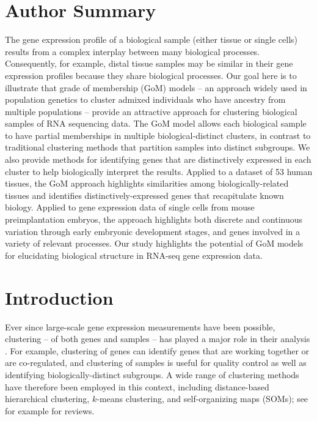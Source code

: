 \documentclass[10pt,letterpaper]{article}
\begin{document}
\section*{Author Summary}
The gene expression profile of a biological sample (either tissue or single cells) results from a complex interplay between many biological processes. Consequently, for example, distal tissue samples may be similar in their gene expression profiles because they share biological processes. Our goal here is to illustrate that grade of membership (GoM) models -- an approach widely used in population genetics to cluster admixed individuals who have ancestry from multiple populations -- provide an attractive approach for clustering biological samples of RNA sequencing data. The GoM model allows each biological sample to have partial memberships in multiple biological-distinct clusters, in contrast to traditional clustering methods that partition samples into distinct subgroups. We also provide methods for identifying genes that are distinctively expressed in each cluster to help biologically interpret the results. Applied to a dataset of 53 human tissues, the GoM approach highlights similarities among biologically-related tissues and identifies distinctively-expressed genes that recapitulate known biology. Applied to gene expression data of single cells from mouse preimplantation embryos, the approach highlights both discrete and continuous variation through early embryonic development stages, and genes involved in a variety of relevant processes. Our study highlights the potential of GoM models for elucidating biological structure in RNA-seq gene expression data.
\linenumbers


\section*{Introduction}

Ever since large-scale gene expression measurements have been possible, clustering -- of both genes and samples --
has played a major role in their analysis \cite{Alizadeh2000, Eisen1998, Golub1999}.
For example, clustering of genes can identify genes that are working together or are co-regulated, and clustering of samples is useful for quality control
as well as identifying biologically-distinct subgroups. A wide range of clustering methods have therefore
been employed in this context, including distance-based hierarchical clustering, $k$-means clustering, and self-organizing maps (SOMs); see for example \cite{D'haeseleer2005, Jiang2004} for reviews.
\end{document}
